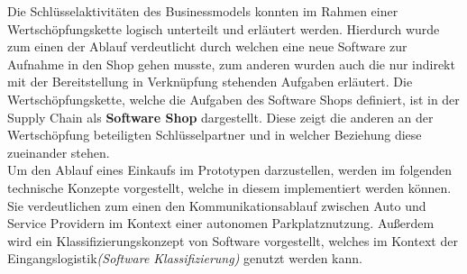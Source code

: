 Die Schlüsselaktivitäten des Businessmodels konnten im Rahmen einer Wertschöpfungskette logisch unterteilt und erläutert werden. Hierdurch wurde zum einen der Ablauf verdeutlicht durch welchen eine neue Software zur Aufnahme in den Shop gehen musste, zum anderen wurden auch die nur indirekt mit der Bereitstellung in Verknüpfung stehenden Aufgaben erläutert. Die Wertschöpfungskette, welche die Aufgaben des Software Shops definiert, ist in der Supply Chain als \textbf{Software Shop} dargestellt. Diese zeigt die anderen an der Wertschöpfung beteiligten Schlüsselpartner und in welcher Beziehung diese zueinander stehen.\\

Um den Ablauf eines Einkaufs im Prototypen darzustellen, werden im folgenden technische Konzepte vorgestellt, welche in diesem implementiert werden können. Sie verdeutlichen zum einen den Kommunikationsablauf zwischen Auto und Service Providern im Kontext einer autonomen Parkplatznutzung. Außerdem wird ein Klassifizierungskonzept von Software vorgestellt, welches im Kontext der Eingangslogistik\textit{(Software Klassifizierung)} genutzt werden kann.